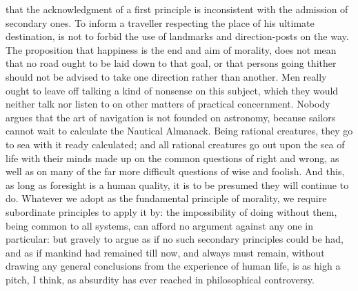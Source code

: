 that the acknowledgment of a first principle is inconsistent with the
admission of secondary ones. To inform a traveller respecting the
place of his ultimate destination, is not to forbid the  use
of landmarks and direction-posts on the way. The proposition that
happiness is the end and aim of morality, does not mean that no road
ought to be laid down to that goal, or that persons going thither
should not be advised to take one direction rather than another. Men
really ought to leave off talking a kind of nonsense on this subject,
which they would neither talk nor listen to on other matters of
practical concernment. Nobody argues that the art of navigation is not
founded on astronomy, because sailors cannot wait to calculate the
Nautical Almanack. Being rational creatures, they go to sea with it
ready calculated; and all rational creatures go out upon the sea of
life with their minds made up on the common questions of right and
wrong, as well as on many of the far more difficult questions of
wise and foolish. And this, as long as foresight is a human quality,
it is to be presumed they will continue to do. Whatever we adopt as
the fundamental principle of morality, we require subordinate
principles to apply it by: the impossibility of doing without them,
being common to all systems, can afford no argument against any one in
particular: but gravely to argue as if no such secondary principles
could be had, and as if mankind had remained till now, and always must
remain, without drawing any general conclusions from the experience of
human life, is as high a pitch, I think, as absurdity has ever reached
in philosophical controversy.

